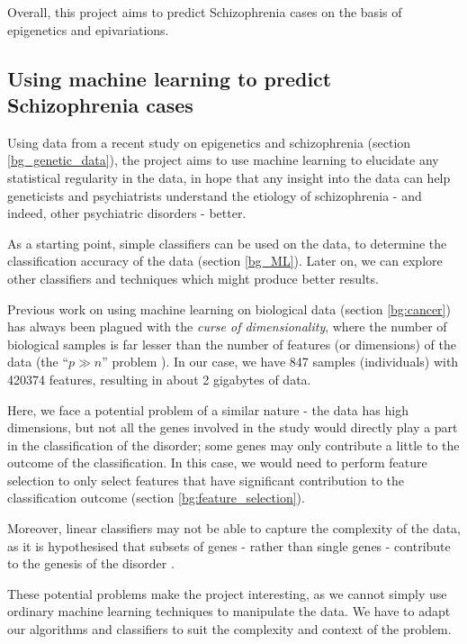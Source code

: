 \documentclass[12pt, twoside, a4paper]{article}
\begin{document}
Overall, this project aims to predict Schizophrenia cases on the basis of epigenetics and epivariations.


\subsection{Using machine learning to predict Schizophrenia cases} \label{intro_ML}

Using data from a recent study on epigenetics and schizophrenia (section \ref{bg_genetic_data}), the project aims to use machine learning to elucidate any statistical regularity in the data, in hope that any insight into the data can help geneticists and psychiatrists understand the etiology of schizophrenia - and indeed, other psychiatric disorders - better.

As a starting point, simple classifiers can be used on the data, to determine the classification accuracy of the data (section \ref{bg_ML}). Later on, we can explore other classifiers and techniques which might produce better results.

Previous work on using machine learning on biological data (section \ref{bg:cancer}) has always been plagued with the \textit{curse of dimensionality}, where the number of biological samples is far lesser than the number of features (or dimensions) of the data (the ``$p \gg n$'' problem \cite{RefWorks:96}). In our case, we have 847 samples (individuals) with 420374 features, resulting in about 2 gigabytes of data.

Here, we face a potential problem of a similar nature - the data has high dimensions, but not all the genes involved in the study would directly play a part in the classification of the disorder; some genes may only contribute a little to the outcome of the classification. In this case, we would need to perform feature selection to only select features that have significant contribution to the classification outcome (section \ref{bg:feature_selection}).

Moreover, linear classifiers may not be able to capture the complexity of the data, as it is hypothesised that subsets of genes - rather than single genes - contribute to the genesis of the disorder \cite{RefWorks:10}.

These potential problems make the project interesting, as we cannot simply use ordinary machine learning techniques to manipulate the data. We have to adapt our algorithms and classifiers to suit the complexity and context of the problem.
\end{document}
